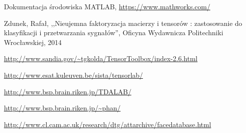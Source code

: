 \documentclass[11pt, a4paper]{article}
\begin{document}
\newpage
\begin{thebibliography}{40}

Dokumentacja środowiska MATLAB,
\url{https://www.mathworks.com/}

Zdunek, Rafał, ,,Nieujemna faktoryzacja macierzy i tensorów : zastosowanie do klasyfikacji i przetwarzania sygnałów'', Oficyna Wydawnicza Politechniki Wrocławskiej, 2014

\url{http://www.sandia.gov/~tgkolda/TensorToolbox/index-2.6.html}

\url{http://www.esat.kuleuven.be/sista/tensorlab/}

\url{http://www.bsp.brain.riken.jp/TDALAB/}

\url{http://www.bsp.brain.riken.jp/~phan/}

\url{http://www.cl.cam.ac.uk/research/dtg/attarchive/facedatabase.html}

\end{thebibliography}
\end{document}
